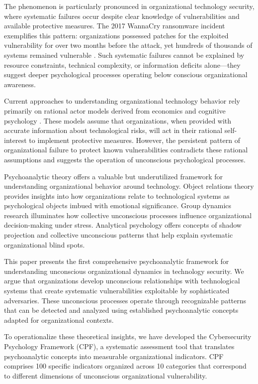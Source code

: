 \documentclass[10pt, twocolumn]{article}
\begin{document}
The phenomenon is particularly pronounced in organizational technology security, where systematic failures occur despite clear knowledge of vulnerabilities and available protective measures. The 2017 WannaCry ransomware incident exemplifies this pattern: organizations possessed patches for the exploited vulnerability for over two months before the attack, yet hundreds of thousands of systems remained vulnerable \cite{verizon2023}. Such systematic failures cannot be explained by resource constraints, technical complexity, or information deficits alone—they suggest deeper psychological processes operating below conscious organizational awareness.

Current approaches to understanding organizational technology behavior rely primarily on rational actor models derived from economics and cognitive psychology \cite{ajzen1991, rogers2003}. These models assume that organizations, when provided with accurate information about technological risks, will act in their rational self-interest to implement protective measures. However, the persistent pattern of organizational failure to protect known vulnerabilities contradicts these rational assumptions and suggests the operation of unconscious psychological processes.

Psychoanalytic theory offers a valuable but underutilized framework for understanding organizational behavior around technology. Object relations theory \cite{klein1946, winnicott1971} provides insights into how organizations relate to technological systems as psychological objects imbued with emotional significance. Group dynamics research \cite{bion1961} illuminates how collective unconscious processes influence organizational decision-making under stress. Analytical psychology \cite{jung1969} offers concepts of shadow projection and collective unconscious patterns that help explain systematic organizational blind spots.

This paper presents the first comprehensive psychoanalytic framework for understanding unconscious organizational dynamics in technology security. We argue that organizations develop unconscious relationships with technological systems that create systematic vulnerabilities exploitable by sophisticated adversaries. These unconscious processes operate through recognizable patterns that can be detected and analyzed using established psychoanalytic concepts adapted for organizational contexts.

To operationalize these theoretical insights, we have developed the Cybersecurity Psychology Framework (CPF), a systematic assessment tool that translates psychoanalytic concepts into measurable organizational indicators. CPF comprises 100 specific indicators organized across 10 categories that correspond to different dimensions of unconscious organizational vulnerability.
\end{document}
